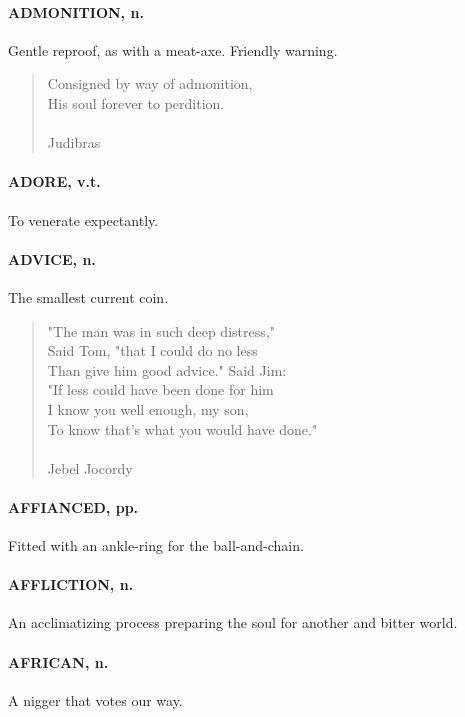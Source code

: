\documentclass[11pt]{article}
\begin{document}
\paragraph{ADMONITION, n.}  Gentle reproof, as with a meat-axe.  Friendly warning.

\begin{quote}   Consigned by way of admonition, \\
  His soul forever to perdition. \\
 \\
Judibras \end{quote}


\paragraph{ADORE, v.t.}  To venerate expectantly.

\paragraph{ADVICE, n.}  The smallest current coin.

\begin{quote}   "The man was in such deep distress," \\
  Said Tom, "that I could do no less \\
  Than give him good advice."  Said Jim: \\
  "If less could have been done for him \\
  I know you well enough, my son, \\
  To know that's what you would have done." \\
 \\
Jebel Jocordy \end{quote}


\paragraph{AFFIANCED, pp.}  Fitted with an ankle-ring for the ball-and-chain.

\paragraph{AFFLICTION, n.}  An acclimatizing process preparing the soul for
another and bitter world.

\paragraph{AFRICAN, n.}  A nigger that votes our way.
\end{document}

